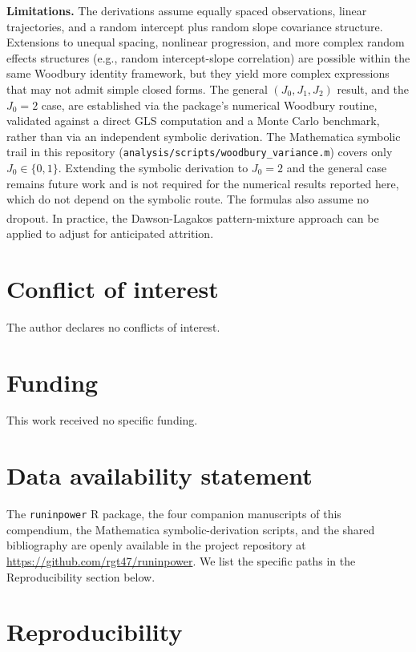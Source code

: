 \documentclass[
  11pt,
]{article}
\begin{document}
\textbf{Limitations.} The derivations assume equally spaced
observations, linear trajectories, and a random intercept
plus random slope covariance structure. Extensions to unequal
spacing, nonlinear progression, and more complex random
effects structures (e.g., random intercept-slope correlation)
are possible within the same Woodbury identity framework, but
they yield more complex expressions that may not admit simple
closed forms. The general \((J_0, J_1, J_2)\) result, and the
\(J_0 = 2\) case, are established via the package's numerical
Woodbury routine, validated against a direct GLS computation
and a Monte Carlo benchmark, rather than via an independent
symbolic derivation. The Mathematica symbolic trail in this
repository (\texttt{analysis/scripts/woodbury\_variance.m}) covers
only \(J_0 \in \{0, 1\}\). Extending the symbolic derivation to
\(J_0 = 2\) and the general case remains future work and is not
required for the numerical results reported here, which do
not depend on the symbolic route. The formulas also assume no
dropout. In practice, the Dawson-Lagakos pattern-mixture
approach\textsuperscript{} can be applied to adjust
for anticipated attrition.

\section{Conflict of interest}\label{conflict-of-interest}

The author declares no conflicts of interest.

\section{Funding}\label{funding}

This work received no specific funding.

\section{Data availability statement}\label{data-availability-statement}

The \texttt{runinpower} R package, the four companion manuscripts
of this compendium, the Mathematica symbolic-derivation scripts,
and the shared bibliography are openly available in the
project repository at
\url{https://github.com/rgt47/runinpower}.
We list the specific paths in the Reproducibility section
below.

\section{Reproducibility}\label{reproducibility}
\end{document}
